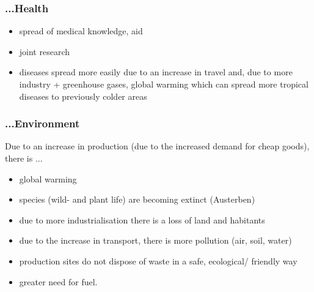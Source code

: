 \documentclass[a5paper,12pt,twoside,titlepage]{scrartcl}
\begin{document}
\subsubsection{...Health}
	\begin{itemize}
		\item spread of medical knowledge, aid
		\item joint research
		\item diseases spread more easily due to an increase in travel and, due to more industry + greenhouse gases, global warming which can spread more tropical diseases to previously colder areas
	\end{itemize}
\subsubsection{...Environment}
Due to an increase in production (due to the increased demand for cheap goods), there is ...
	\begin{itemize} 
		\item global warming
		\item species (wild- and plant life) are becoming extinct (Austerben)
		\item due to more industrialisation there is a loss of land and habitants
		\item due to the increase in transport, there is more pollution (air, soil, water)
		\item production sites do not dispose of waste in a safe, ecological/ friendly way
		\item greater need for fuel.
	\end{itemize}
\end{document}
